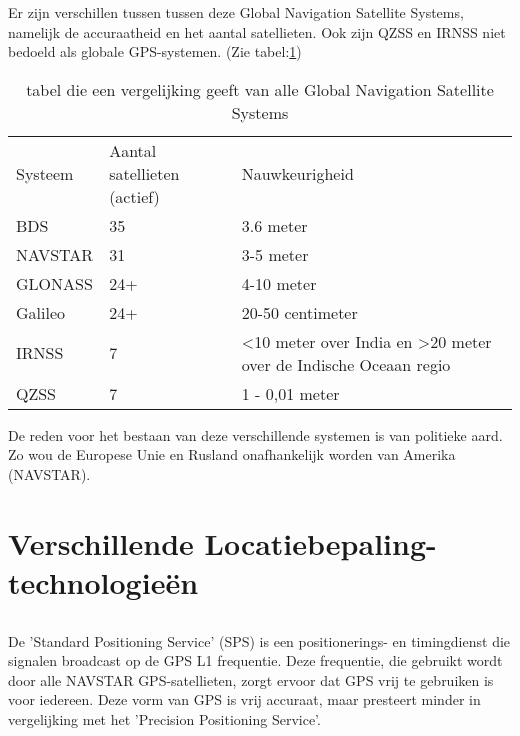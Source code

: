 Er zijn verschillen tussen tussen deze Global Navigation Satellite Systems, namelijk de accuraatheid en het aantal satellieten. Ook zijn QZSS en IRNSS niet bedoeld als globale GPS-systemen. (Zie tabel:\ref{tab:GNSS-vergelijking})
\begin{table}[]
	\begin{tabular}{lll}
		Systeem & Aantal satellieten (actief) & Nauwkeurigheid                                                                        \\
				BDS     & 35                          & 3.6 meter                                                                      \\
		NAVSTAR & 31                          & 3-5 meter                                                                             \\
		GLONASS & 24+                         & 4-10 meter                                                                            \\
		Galileo & 24+                         & 20-50 centimeter                                                                      \\
		IRNSS   & 7                           & \textless 10 meter over India en \textgreater{}20 meter over de Indische Oceaan regio \\
		QZSS    & 7                           & 1 - 0,01 meter                                                                       
	\end{tabular}
\label{tab:GNSS-vergelijking}
\caption{tabel die een vergelijking geeft van alle Global Navigation Satellite Systems}
\autocite{gnss}
\end{table}
\newline
De reden voor het bestaan van deze verschillende systemen is van politieke aard. Zo wou de Europese Unie en Rusland onafhankelijk worden van Amerika (NAVSTAR). 

\section{Verschillende Locatiebepaling-technologieën}
\subsection{}
De 'Standard Positioning Service' (SPS) is een positionerings- en timingdienst die signalen broadcast op de GPS L1 frequentie. Deze frequentie, die gebruikt wordt door alle NAVSTAR GPS-satellieten, zorgt ervoor dat GPS vrij te gebruiken is voor iedereen. \autocite{gps}
\newline
Deze vorm van GPS is vrij accuraat, maar presteert minder in vergelijking met het 'Precision Positioning Service'. 
